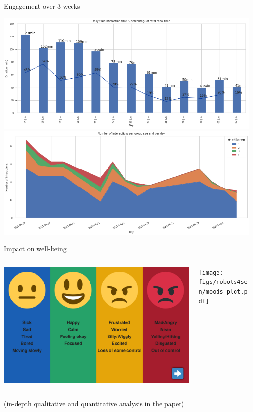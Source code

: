 \documentclass[xcolor=table]{beamer}
\begin{document}
{\begin{frame}{Engagement over 3 weeks}
    \begin{center}
        \includegraphics[width=0.8\linewidth]{figs/robots4sen/fig4.png}
        \includegraphics[width=0.8\linewidth]{figs/robots4sen/fig1.2.png}
    \end{center}
\end{frame}

\begin{frame}{Impact on well-being}
    \begin{columns}
        \begin{column}{0.5\linewidth}
            \begin{center}
                \includegraphics[width=\linewidth]{figs/robots4sen/moods.png}
            \end{center}
        \end{column}
        \begin{column}{0.5\linewidth}
            \begin{center}
                \texttt{[image: figs/robots4sen/moods\_plot.pdf]}
            \end{center}
        \end{column}
    \end{columns}

    \begin{center}
        \small (in-depth qualitative and quantitative analysis in the paper)
    \end{center}
\end{frame}
}
\end{document}
